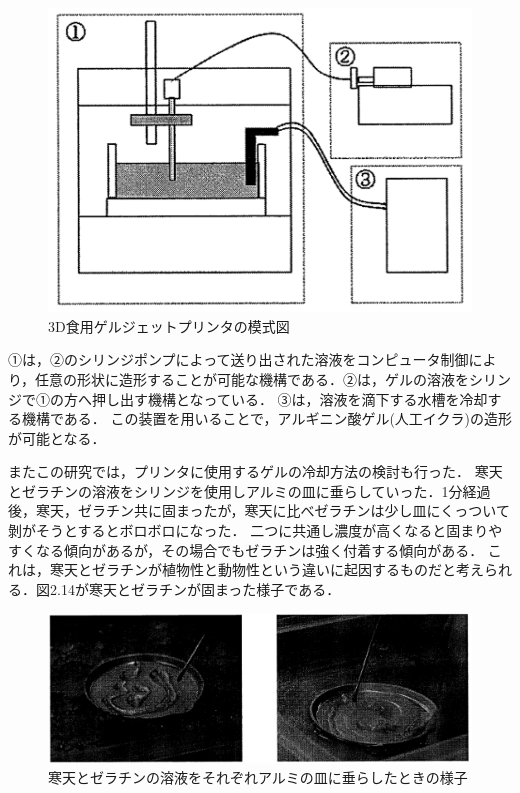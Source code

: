 \begin{figure}[H]
  \centering
  \includegraphics[width=10truecm]{./fig/geru.png}
  \caption{3D食用ゲルジェットプリンタの模式図}
  \label{fig:ferret}
\end{figure}

①は，②のシリンジポンプによって送り出された溶液をコンピュータ制御により，任意の形状に造形することが可能な機構である．②は，ゲルの溶液をシリンジで①の方へ押し出す機構となっている．
③は，溶液を滴下する水槽を冷却する機構である．
この装置を用いることで，アルギニン酸ゲル(人工イクラ)の造形が可能となる．

またこの研究では，プリンタに使用するゲルの冷却方法の検討も行った．
寒天とゼラチンの溶液をシリンジを使用しアルミの皿に垂らしていった．1分経過後，寒天，ゼラチン共に固まったが，寒天に比べゼラチンは少し皿にくっついて剝がそうとするとボロボロになった．
二つに共通し濃度が高くなると固まりやすくなる傾向があるが，その場合でもゼラチンは強く付着する傾向がある．
これは，寒天とゼラチンが植物性と動物性という違いに起因するものだと考えられる．図2.14が寒天とゼラチンが固まった様子である．

\begin{figure}[H]
  \centering
  \includegraphics[width=12truecm]{./fig/geru2.png}
  \caption{寒天とゼラチンの溶液をそれぞれアルミの皿に垂らしたときの様子}
  \label{fig:ferret}
\end{figure}

